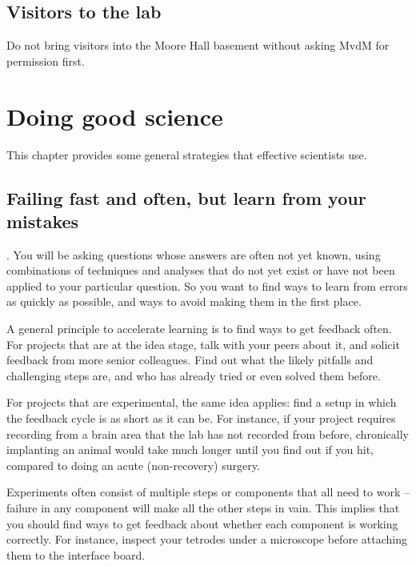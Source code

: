\documentclass{tufte-book}
\begin{document}
\section{Visitors to the lab}

Do not bring visitors into the Moore Hall
basement without asking MvdM for permission first.


\chapter{Doing good science}

This chapter provides some general strategies that effective
scientists use.

\section{Failing fast and often, but learn from your mistakes}

. You will be
asking questions whose answers are often not yet known, using
combinations of techniques and analyses that do not yet exist or have
not been applied to your particular question. So you want to find ways
to learn from errors as quickly as possible, and ways to avoid making
them in the first place.

A general principle to accelerate learning is to find ways to get
feedback often. For projects that are at the idea stage, talk with
your peers about it, and solicit feedback from more senior
colleagues. Find out what the likely pitfalls and challenging steps
are, and who has already tried or even solved them before.

For projects that are experimental, the same idea applies: find a
setup in which the feedback cycle is as short as it can be. For
instance, if your project requires recording from a brain area that
the lab has not recorded from before, chronically implanting an animal
would take much longer until you find out if you hit, compared to
doing an acute (non-recovery) surgery.

Experiments often consist of multiple steps or components that all
need to work -- failure in any component will make all the other steps
in vain. This implies
that you should find ways to get feedback about whether each component
is working correctly. For instance, inspect your tetrodes under a
microscope before attaching them to the interface board.
\end{document}
